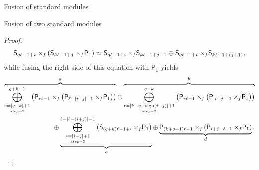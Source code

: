 \documentclass[reqno]{amsart}
\newcommand{\ds}[1]{\mathsf S_{#1}}
\newcommand{\dP}[1]{\mathsf P_{#1}}
\newcommand{\xf}{\times\hspace{-0.27em}_f}
\newcommand{\lc}{\ell}
\begin{document}
\begin{section}{Fusion of standard modules}
\begin{subsection}{Fusion of two standard modules}
\begin{proof}
\begin{align}\label{eq:fusionSvsS.3}
	\ds{q \lc-1 +i} \xf \left(\ds{k \lc -1 +j} \xf \dP{1} \right) \simeq \ds{q \lc -1+i} \xf \ds{k \lc -1 +j-1} \oplus \ds{q \lc -1 +i} \xf \ds{k \lc -1 +(j+1)},
\end{align}
while fusing the right side of this equation with $\dP{1}$ yields
\begin{align}
	\overbrace{\overset{q+k-1}{\underset{\underset{step =2}{r = |q-k|+1}}{\bigoplus}}\left(\dP{r \lc -1} \xf \left(\dP{\lc-|i-j|-1}\xf \dP{1} \right)\right)}^{a} \oplus \overbrace{\overset{q+k}{\underset{\underset{step =2}{r = |k-q-\text{sign}(i-j)| + 1}}{\bigoplus}}\left(\dP{r \lc -1} \xf \left(\dP{|i-j|-1} \xf \dP{1} \right) \right)}^{b} \notag \\
\oplus  \underbrace{\overset{\lc -|\lc-(i+j)|-1}{\underset{\underset{step =2}{s = |i-j|+1}}{\bigoplus}}\left(\ds{(q+k) \lc -1 + s}\xf \dP{1} \right)}_{c} \oplus \underbrace{\dP{(k+q+1)\lc -1} \xf \left(\dP{i+j - \lc -1}\xf \dP{1} \right)}_{d}.
\end{align}


\end{proof}
\end{subsection}
\end{section}
\end{document}
